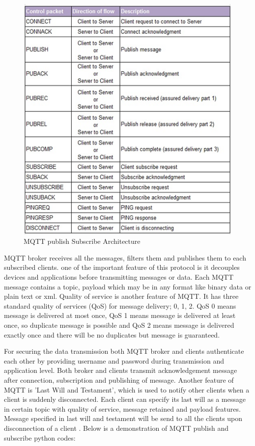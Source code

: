 \documentclass[sigconf]{acmart}
\begin{document}
\begin{figure}[htb]
\includegraphics[width=1.0\columnwidth]{images/MQTT.png}
\caption{MQTT publish Subscribe Architecture}\label{p:Publish Subscribe Architecture}
\end{figure}


MQTT broker receives all the messages, filters them and publishes them to each subscribed clients. one of the important feature of this protocol is it decouples devices and applications before transmitting messages or data. Each MQTT message contains a topic, payload which may be in any format like binary data or plain text or xml. Quality of service is another feature of MQTT. It has three standard quality of services (QoS) for message delivery; 0, 1, 2. QoS 0 means message is delivered at most once, QoS 1 means message is delivered at least once, so duplicate message is possible and QoS 2 means message is delivered exactly once and there will be no duplicates but message is guaranteed.

For securing the data transmission both MQTT broker and clients authenticate each other by providing username and password during transmission and application level. Both broker and clients transmit acknowledgement message after connection, subscription and publishing of message. Another feature of MQTT is 'Last Will and Testament', which is used to notify other clients when a client is suddenly disconnected. Each client can specify its last will  as a message in certain topic with quality of service, message retained and payload features. Message specified in last will and testament will be send to all the clients upon disconnection of a client \cite{hivemq}. Below is a demonstration of MQTT publish and subscribe python codes:
\end{document}
